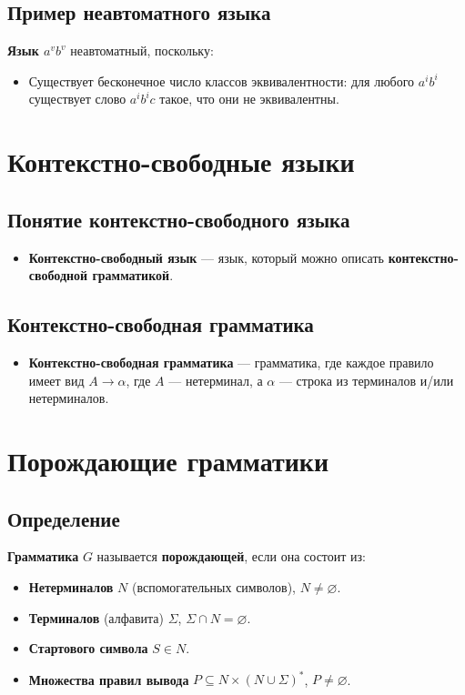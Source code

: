 \documentclass{article}
\begin{document}
\begin{itemize}
\subsection{Пример неавтоматного языка}
\textbf{Язык $a^vb^v$} неавтоматный, поскольку:

\begin{itemize}
  \item Существует бесконечное число классов эквивалентности: для любого $a^ib^i$ существует слово $a^ib^ic$ такое, что они не эквивалентны.
\end{itemize}

\section{Контекстно-свободные языки}
\subsection{Понятие контекстно-свободного языка}
\begin{itemize}
  \item \textbf{Контекстно-свободный язык} — язык, который можно описать \textbf{контекстно-свободной грамматикой}.
\end{itemize}

\subsection{Контекстно-свободная грамматика}
\begin{itemize}
  \item \textbf{Контекстно-свободная грамматика} — грамматика, где каждое правило имеет вид $A \to \alpha$, где $A$ — нетерминал, а $\alpha$ — строка из терминалов и/или нетерминалов.
\end{itemize}
\section{Порождающие грамматики}

\subsection{Определение}

\textbf{Грамматика} $G$ называется \textbf{порождающей}, если она состоит из:

\begin{itemize}
\item \textbf{Нетерминалов} $N$ (вспомогательных символов), $N \neq \varnothing$.
\item \textbf{Терминалов} (алфавита) $\Sigma$, $\Sigma \cap N = \varnothing$.
\item \textbf{Стартового символа} $S \in N$.
\item \textbf{Множества правил вывода} $P \subseteq N \times (N \cup \Sigma)^*$, $P \neq \varnothing$.
\end{itemize}


\end{itemize}
\end{document}
